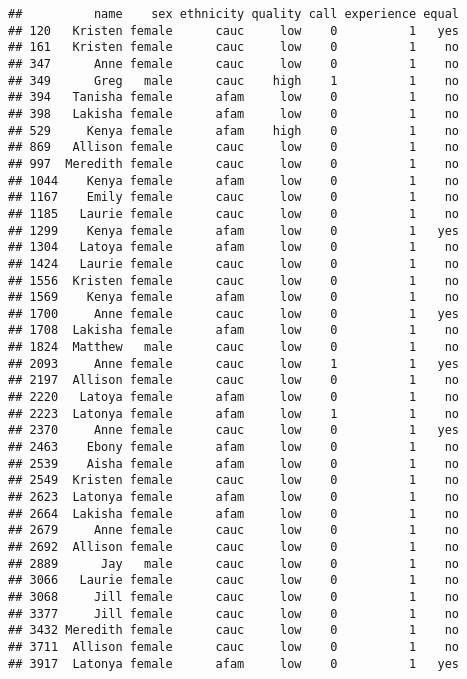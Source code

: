 \documentclass[
]{article}
\begin{document}
\begin{verbatim}
##          name    sex ethnicity quality call experience equal
## 120   Kristen female      cauc     low    0          1   yes
## 161   Kristen female      cauc     low    0          1    no
## 347      Anne female      cauc     low    0          1    no
## 349      Greg   male      cauc    high    1          1    no
## 394   Tanisha female      afam     low    0          1    no
## 398   Lakisha female      afam     low    0          1    no
## 529     Kenya female      afam    high    0          1    no
## 869   Allison female      cauc     low    0          1    no
## 997  Meredith female      cauc     low    0          1    no
## 1044    Kenya female      afam     low    0          1    no
## 1167    Emily female      cauc     low    0          1    no
## 1185   Laurie female      cauc     low    0          1    no
## 1299    Kenya female      afam     low    0          1   yes
## 1304   Latoya female      afam     low    0          1    no
## 1424   Laurie female      cauc     low    0          1    no
## 1556  Kristen female      cauc     low    0          1    no
## 1569    Kenya female      afam     low    0          1    no
## 1700     Anne female      cauc     low    0          1   yes
## 1708  Lakisha female      afam     low    0          1    no
## 1824  Matthew   male      cauc     low    0          1    no
## 2093     Anne female      cauc     low    1          1   yes
## 2197  Allison female      cauc     low    0          1    no
## 2220   Latoya female      afam     low    0          1    no
## 2223  Latonya female      afam     low    1          1    no
## 2370     Anne female      cauc     low    0          1   yes
## 2463    Ebony female      afam     low    0          1    no
## 2539    Aisha female      afam     low    0          1    no
## 2549  Kristen female      cauc     low    0          1    no
## 2623  Latonya female      afam     low    0          1    no
## 2664  Lakisha female      afam     low    0          1    no
## 2679     Anne female      cauc     low    0          1    no
## 2692  Allison female      cauc     low    0          1    no
## 2889      Jay   male      cauc     low    0          1    no
## 3066   Laurie female      cauc     low    0          1    no
## 3068     Jill female      cauc     low    0          1    no
## 3377     Jill female      cauc     low    0          1    no
## 3432 Meredith female      cauc     low    0          1    no
## 3711  Allison female      cauc     low    0          1    no
## 3917  Latonya female      afam     low    0          1   yes

\end{verbatim}
\end{document}
